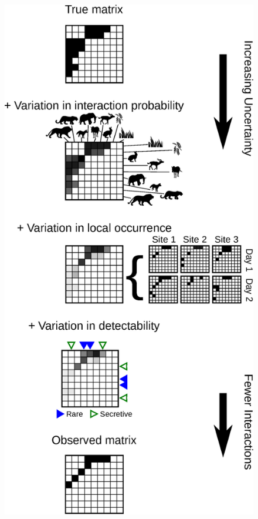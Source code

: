 \documentclass[12pt]{article}
\begin{document}
\begin{figure}[h!]
\begin{center}
    \includegraphics*[height=.5\textheight]{Figure_1.eps}
    \end{center}
    \end{figure}
\end{document}
